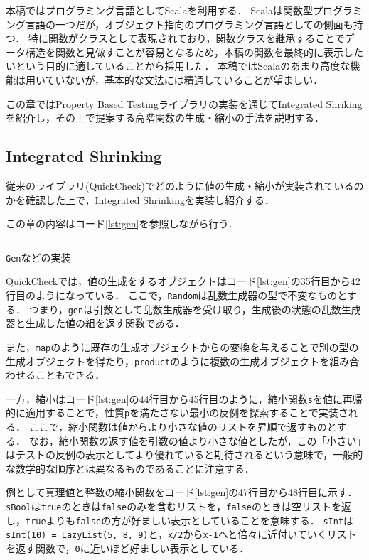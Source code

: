 \documentclass[submit,PRO]{ipsj}
\theoremstyle{definition}
\begin{document}
本稿ではプログラミング言語としてScala\cite{scala_online}を利用する．
Scalaは関数型プログラミング言語の一つだが，オブジェクト指向のプログラミング言語としての側面も持つ．
特に関数がクラスとして表現されており，関数クラスを継承することでデータ構造を関数と見做すことが容易となるため，本稿の関数を最終的に表示したいという目的に適していることから採用した．
本稿ではScalaのあまり高度な機能は用いていないが，基本的な文法には精通していることが望ましい．

この章ではProperty Based Testingライブラリの実装を通じてIntegrated Shrikingを紹介し，その上で提案する高階関数の生成・縮小の手法を説明する．

\subsection{Integrated Shrinking}

従来のライブラリ(QuickCheck\cite{claessen_quickcheck_2011})でどのように値の生成・縮小が実装されているのかを確認した上で，Integrated Shrinkingを実装し紹介する．

この章の内容はコード\ref{lst:gen}を参照しながら行う．

\begin{listing*}[hbt]
  \inputminted[breaklines,autogobble,linenos,firstline=35,lastline=76]{scala}{../src/main/scala/minicheck.scala}
  \caption{\texttt{Gen}などの実装}
  \label{lst:gen}
\end{listing*}

QuickCheckでは，値の生成をするオブジェクトはコード\ref{lst:gen}の35行目から42行目のようになっている．
ここで，\texttt{Random}は乱数生成器の型で不変なものとする．
つまり，\texttt{gen}は引数として乱数生成器を受け取り，生成後の状態の乱数生成器と生成した値の組を返す関数である．

また，\texttt{map}のように既存の生成オブジェクトからの変換を与えることで別の型の生成オブジェクトを得たり，\texttt{product}のように複数の生成オブジェクトを組み合わせることもできる．

一方，縮小はコード\ref{lst:gen}の44行目から45行目のように，縮小関数\texttt{s}を値に再帰的に適用することで，性質\texttt{p}を満たさない最小の反例を探索することで実装される．
ここで，縮小関数は値からより小さな値のリストを昇順で返すものとする．
なお，縮小関数の返す値を引数の値より小さな値としたが，この「小さい」はテストの反例の表示としてより優れていると期待されるという意味で，一般的な数学的な順序とは異なるものであることに注意する．

例として真理値と整数の縮小関数をコード\ref{lst:gen}の47行目から48行目に示す．
\texttt{sBool}は\texttt{true}のときは\texttt{false}のみを含むリストを，\texttt{false}のときは空リストを返し，\texttt{true}よりも\texttt{false}の方が好ましい表示としていることを意味する．
\texttt{sInt}は\texttt{sInt(10) = LazyList(5, 8, 9)}と，\texttt{x/2}から\texttt{x-1}へと倍々に近付いていくリストを返す関数で，\texttt{0}に近いほど好ましい表示としている．
\end{document}
